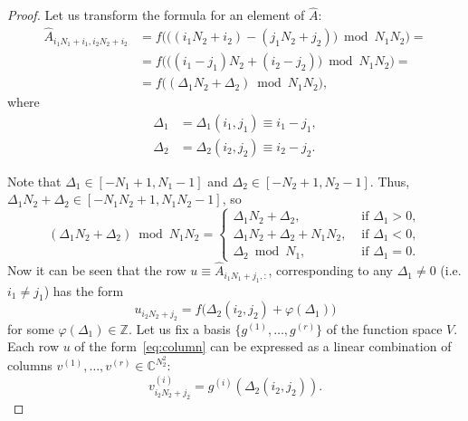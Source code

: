 \documentclass[a4paper]{article}
\begin{document}
	\begin{proof}
	    Let us transform the formula for an element of  $\widehat{A}$:
	    \begin{align*}
			\widehat{A}_{i_1N_1 + i_1, i_2N_2 + i_2} &= 
			f\Big(\big((i_1N_2 + i_2) - (j_1N_2 + j_2)\big) \bmod N_1N_2\Big) = \\ &=
			f\Big(\big((i_1-j_1)N_2 + (i_2 - j_2)\big) \bmod N_1N_2\Big) = \\ &=
			f\big((\Delta_1 N_2 + \Delta_2) \bmod N_1N_2\big),
		\end{align*}
		where
    	\begin{align*}
		\Delta_1 &= \Delta_1(i_1,j_1) \equiv i_1-j_1, \\
		\Delta_2 &= \Delta_2(i_2,j_2) \equiv i_2-j_2.
		\end{align*}
		
		
		Note that $\Delta_1 \in [-N_1+1,N_1-1]$ and $\Delta_2 \in [-N_2+1, N_2 -1]$.
		Thus, $\Delta_1N_2 + \Delta_2  \in [-N_1N_2+1, N_1N_2 - 1]$, so
		\[
		(\Delta_1N_2 + \Delta_2) \bmod N_1N_2 =
		\begin{cases}
		    \Delta_1N_2 + \Delta_2,          & \text{ if } \Delta_1 > 0, \\
		    \Delta_1N_2 + \Delta_2 + N_1N_2, & \text{ if } \Delta_1 < 0, \\
		    \Delta_2 \bmod N_1,         & \text{ if } \Delta_1 = 0.
		\end{cases}
		\] 
		Now it can be seen that the row $u \equiv \widehat{A}_{i_1N_1+j_1,:}$, corresponding to  any $\Delta_1 \neq 0$ (i.e. $i_1 \neq j_1$) has the form
		\begin{equation}\label{eq:column}
		 	u_{i_2N_2+j_2} = 
		 	f\big(\Delta_2(i_2,j_2) + \varphi(\Delta_1)\big)
		\end{equation}
		for some $\varphi(\Delta_1) \in \mathbb{Z}$.
		Let us fix a basis $\{g^{(1)}, \dots, g^{(r)}\}$ of the function space  $V$.
		Each row $u$ of the form~\eqref{eq:column} can be expressed as a linear combination of columns $v^{(1)}, \dots, v^{(r)} \in \mathbb{C}^{N_2^2}$:
		\[
			v^{(i)}_{i_2N_2+j_2} = 
			g^{(i)}(\Delta_2(i_2,j_2)).
		\]
        		

\end{proof}
\end{document}
